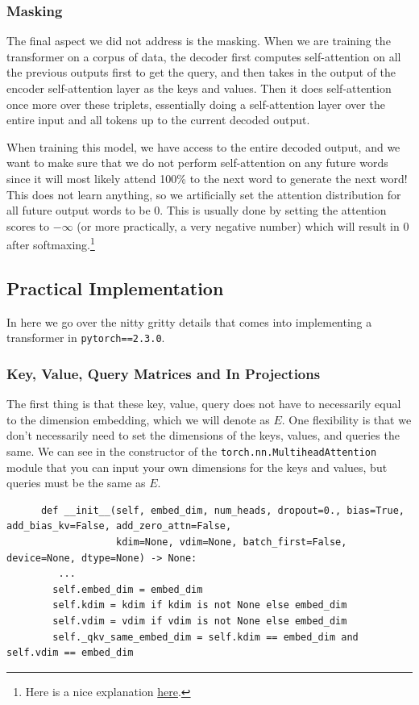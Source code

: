   \subsubsection{Masking}

    The final aspect we did not address is the masking. When we are training the transformer on a corpus of data, the decoder first computes self-attention on all the previous outputs first to get the query, and then takes in the output of the encoder self-attention layer as the keys and values. Then it does self-attention once more over these triplets, essentially doing a self-attention layer over the entire input and all tokens up to the current decoded output. 

    When training this model, we have access to the entire decoded output, and we want to make sure that we do not perform self-attention on any future words since it will most likely attend 100\% to the next word to generate the next word! This does not learn anything, so we artificially set the attention distribution for all future output words to be $0$. This is usually done by setting the attention scores to $-\infty$ (or more practically, a very negative number) which will result in $0$ after softmaxing.\footnote{Here is a nice explanation \href{https://stackoverflow.com/questions/58127059/how-to-understand-masked-multi-head-attention-in-transformer}{here}.}

\subsection{Practical Implementation}

  In here we go over the nitty gritty details that comes into implementing a transformer in \texttt{pytorch==2.3.0}. 

  \subsubsection{Key, Value, Query Matrices and In Projections}

    The first thing is that these key, value, query does not have to necessarily equal to the dimension embedding, which we will denote as $E$. One flexibility is that we don't necessarily need to set the dimensions of the keys, values, and queries the same. We can see in the constructor of the \texttt{torch.nn.MultiheadAttention} module that you can input your own dimensions for the keys and values, but queries must be the same as $E$. 
    \begin{lstlisting}
      def __init__(self, embed_dim, num_heads, dropout=0., bias=True, add_bias_kv=False, add_zero_attn=False,
                   kdim=None, vdim=None, batch_first=False, device=None, dtype=None) -> None:
         ... 
        self.embed_dim = embed_dim
        self.kdim = kdim if kdim is not None else embed_dim
        self.vdim = vdim if vdim is not None else embed_dim
        self._qkv_same_embed_dim = self.kdim == embed_dim and self.vdim == embed_dim
    \end{lstlisting}

